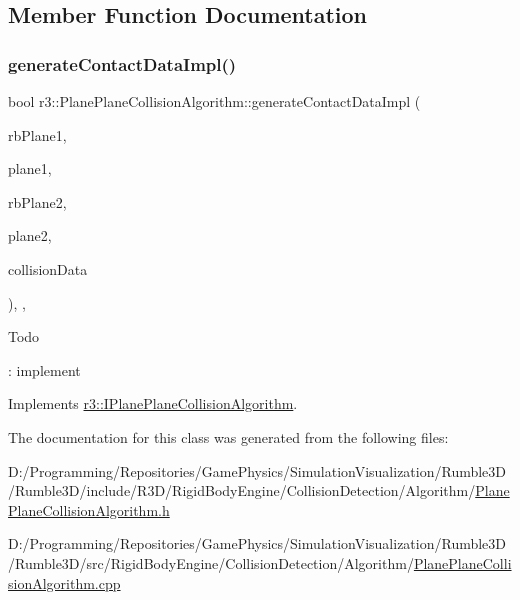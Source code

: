 \subsection{Member Function Documentation}
\mbox{\label{classr3_1_1_plane_plane_collision_algorithm_a33400ba57a8c0550ada0778bb92eeb69}} 
\subsubsection{\texorpdfstring{generate\+Contact\+Data\+Impl()}{generateContactDataImpl()}}
{\footnotesize\ttfamily bool r3\+::\+Plane\+Plane\+Collision\+Algorithm\+::generate\+Contact\+Data\+Impl (\begin{DoxyParamCaption}\item[{\mbox{\hyperlink{classr3_1_1_rigid_body}{Rigid\+Body}} $\ast$}]{rb\+Plane1,  }\item[{\mbox{\hyperlink{classr3_1_1_collision_plane}{Collision\+Plane}} $\ast$}]{plane1,  }\item[{\mbox{\hyperlink{classr3_1_1_rigid_body}{Rigid\+Body}} $\ast$}]{rb\+Plane2,  }\item[{\mbox{\hyperlink{classr3_1_1_collision_plane}{Collision\+Plane}} $\ast$}]{plane2,  }\item[{\mbox{\hyperlink{classr3_1_1_collision_data}{Collision\+Data}} \&}]{collision\+Data }\end{DoxyParamCaption})\hspace{0.3cm}{\ttfamily [override]}, {\ttfamily [protected]}, {\ttfamily [virtual]}}

\begin{DoxyRefDesc}{Todo}
\item[\mbox{\hyperlink{todo__todo000004}{Todo}}]\+: implement \end{DoxyRefDesc}


Implements \mbox{\hyperlink{classr3_1_1_i_plane_plane_collision_algorithm_a708dec70f58b4476976dfea9921d1524}{r3\+::\+I\+Plane\+Plane\+Collision\+Algorithm}}.



The documentation for this class was generated from the following files\+:\begin{DoxyCompactItemize}
\item 
D\+:/\+Programming/\+Repositories/\+Game\+Physics/\+Simulation\+Visualization/\+Rumble3\+D/\+Rumble3\+D/include/\+R3\+D/\+Rigid\+Body\+Engine/\+Collision\+Detection/\+Algorithm/\mbox{\hyperlink{_plane_plane_collision_algorithm_8h}{Plane\+Plane\+Collision\+Algorithm.\+h}}\item 
D\+:/\+Programming/\+Repositories/\+Game\+Physics/\+Simulation\+Visualization/\+Rumble3\+D/\+Rumble3\+D/src/\+Rigid\+Body\+Engine/\+Collision\+Detection/\+Algorithm/\mbox{\hyperlink{_plane_plane_collision_algorithm_8cpp}{Plane\+Plane\+Collision\+Algorithm.\+cpp}}\end{DoxyCompactItemize}
